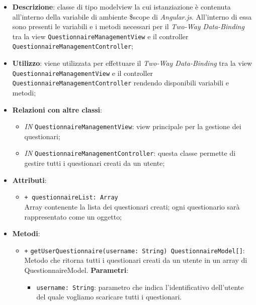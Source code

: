 	\begin{itemize}
		\item \textbf{Descrizione}: classe di tipo modelview la cui istanziazione è contenuta all'interno della variabile di ambiente \$scope di \textit{Angular.js}. All'interno di essa sono presenti le variabili e i metodi necessari per il \textit{Two-Way Data-Binding} tra la view \texttt{QuestionnaireManagementView} e il controller \texttt{QuestionnaireManagementController};
		\item \textbf{Utilizzo}: viene utilizzata per effettuare il \textit{Two-Way Data-Binding} tra la view \texttt{QuestionnaireManagementView} e il controller \texttt{QuestionnaireManagementController} rendendo disponibili variabili e metodi;
		\item \textbf{Relazioni con altre classi}: 
		\begin{itemize}
			\item \textit{IN} \texttt{QuestionnaireManagementView}: view principale per la gestione dei questionari; 
			\item \textit{IN} \texttt{QuestionnaireManagementController}: questa classe permette di gestire tutti i questionari creati da un utente;
		\end{itemize}
		\item \textbf{Attributi}: 
		\begin{itemize}
			\item \texttt{+ questionnaireList: Array} \\ Array contenente la lista dei questionari creati; ogni questionario sarà rappresentato come un oggetto;
		\end{itemize}
		\item \textbf{Metodi}:
		\begin{itemize}
				\item \texttt{+} \texttt{getUserQuestionnaire(username: String) QuestionnaireModel[]}: \\Metodo che ritorna tutti i questionari creati da un utente in un array di QuestionnaireModel.
				\textbf{Parametri}:
				\begin{itemize}
					\item \texttt{username: String}: parametro che indica l'identificativo dell'utente del quale vogliamo scaricare tutti i questionari.
				\end{itemize}
		\end{itemize} 
	\end{itemize}
	
	